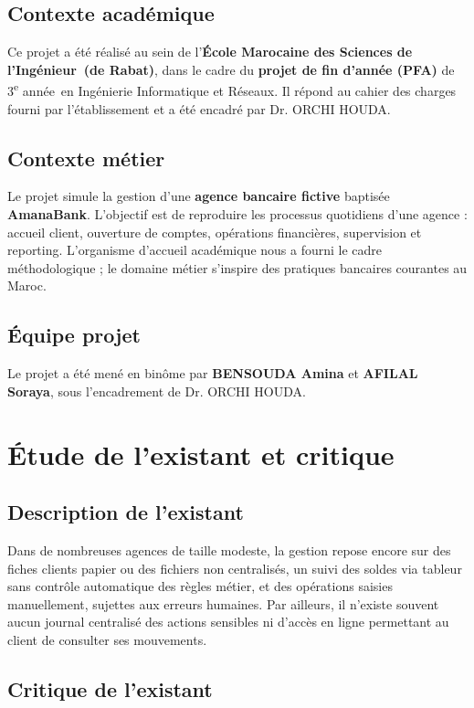 \documentclass[11pt,a4paper,oneside]{report}
\newcommand{\etudianteun}{BENSOUDA Amina}
\newcommand{\etudiantedeux}{AFILAL Soraya}
\newcommand{\encadrante}{Dr. ORCHI HOUDA}
\newcommand{\ecole}{École Marocaine des Sciences de l'Ingénieur}
\newcommand{\villeecole}{de Rabat}
\newcommand{\filiere}{Ingénierie Informatique et Réseaux}
\newcommand{\niveau}{3\textsuperscript{e} année}
\newcommand{\nomapplication}{AmanaBank}
\begin{document}
\subsection{Contexte académique}

Ce projet a été réalisé au sein de l'\textbf{\ecole\ (\villeecole)}, dans le cadre du \textbf{projet de fin d'année (PFA)} de \niveau\ en \filiere. Il répond au cahier des charges fourni par l'établissement et a été encadré par \encadrante.

\subsection{Contexte métier}

Le projet simule la gestion d'une \textbf{agence bancaire fictive} baptisée \textbf{\nomapplication}. L'objectif est de reproduire les processus quotidiens d'une agence : accueil client, ouverture de comptes, opérations financières, supervision et reporting. L'organisme d'accueil académique nous a fourni le cadre méthodologique ; le domaine métier s'inspire des pratiques bancaires courantes au Maroc.

\subsection{Équipe projet}

Le projet a été mené en binôme par \textbf{\etudianteun} et \textbf{\etudiantedeux}, sous l'encadrement de \encadrante.

\section{Étude de l'existant et critique}

\subsection{Description de l'existant}

Dans de nombreuses agences de taille modeste, la gestion repose encore sur des fiches clients papier ou des fichiers non centralisés, un suivi des soldes via tableur sans contrôle automatique des règles métier, et des opérations saisies manuellement, sujettes aux erreurs humaines. Par ailleurs, il n'existe souvent aucun journal centralisé des actions sensibles ni d'accès en ligne permettant au client de consulter ses mouvements.

\subsection{Critique de l'existant}
\end{document}
